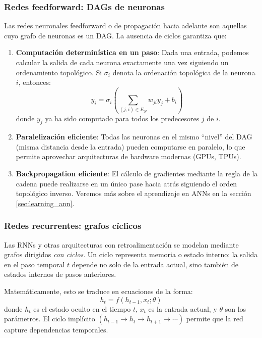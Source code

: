 \subsubsection[Redes feedforward: DAGs de neuronas]{Redes feedforward: \glspl{DAG} de neuronas}

Las redes neuronales feedforward o de propagación hacia adelante son aquellas cuyo grafo de neuronas es un \gls{DAG}. La ausencia de ciclos garantiza que:

\begin{enumerate}
    \item \textbf{Computación determinística en un paso}: Dada una entrada, podemos calcular la salida de cada neurona exactamente una vez siguiendo un ordenamiento topológico. Si $\sigma_i$ denota la ordenación topológica de la neurona $i$, entonces:
    \[
    y_i = \sigma_i\left(\sum_{(j,i) \in E_N} w_{ji} y_j + b_i\right)
    \]
    donde $y_j$ ya ha sido computado para todos los predecesores $j$ de $i$.

    \item \textbf{Paralelización eficiente}: Todas las neuronas en el mismo ``nivel'' del \gls{DAG} (misma distancia desde la entrada) pueden computarse en paralelo, lo que permite aprovechar arquitecturas de hardware modernas (GPUs, TPUs).

    \item \textbf{Backpropagation eficiente}: El cálculo de gradientes mediante la regla de la cadena puede realizarse en un único pase hacia atrás siguiendo el orden topológico inverso. Veremos más sobre el aprendizaje en \glspl{ANN} en la sección \ref{sec:learning_ann}.
\end{enumerate}

\subsubsection{Redes recurrentes: grafos cíclicos}

Las \glspl{RNN} y otras arquitecturas con retroalimentación se modelan mediante grafos dirigidos \textit{con ciclos}. Un ciclo representa memoria o estado interno: la salida en el paso temporal $t$ depende no solo de la entrada actual, sino también de estados internos de pasos anteriores.

Matemáticamente, esto se traduce en ecuaciones de la forma:
\[
h_t = f(h_{t-1}, x_t; \theta)
\]
donde $h_t$ es el estado oculto en el tiempo $t$, $x_t$ es la entrada actual, y $\theta$ son los parámetros. El ciclo implícito $(h_{t-1} \to h_t \to h_{t+1} \to \cdots)$ permite que la red capture dependencias temporales.

